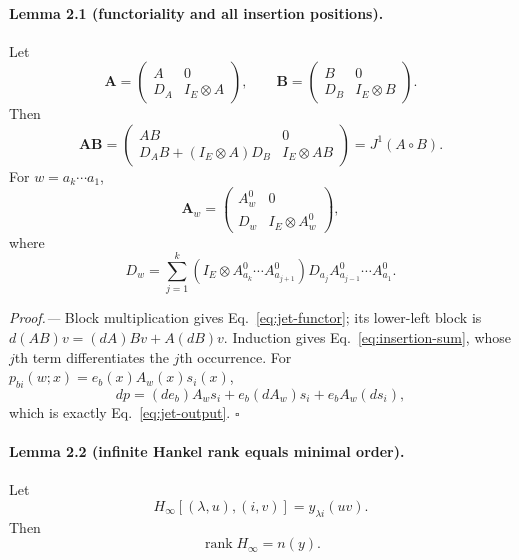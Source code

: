 \documentclass[aps,prl,onecolumn,superscriptaddress,nofootinbib]{revtex4-2}
\newcommand{\rank}{\operatorname{rank}}
\begin{document}
\paragraph{Lemma 2.1 (functoriality and all insertion positions).}
Let
\begin{equation}
 \bm A=\begin{pmatrix}A&0\\D_A&I_E\otimes A\end{pmatrix},
 \qquad
 \bm B=\begin{pmatrix}B&0\\D_B&I_E\otimes B\end{pmatrix}.
\end{equation}
Then
\begin{equation}
 \bm A\bm B=
 \begin{pmatrix}
 AB&0\\D_AB+(I_E\otimes A)D_B&I_E\otimes AB
 \end{pmatrix}=J^1(A\circ B).
 \label{eq:jet-functor}
\end{equation}
For $w=a_k\cdots a_1$,
\begin{equation}
 \bm A_w=
 \begin{pmatrix}A_w^0&0\\D_w&I_E\otimes A_w^0\end{pmatrix},
 \label{eq:word-jet}
\end{equation}
where
\begin{equation}
 D_w=\sum_{j=1}^k
 \left(I_E\otimes A_{a_k}^0\cdots A_{a_{j+1}}^0\right)
 D_{a_j}A_{a_{j-1}}^0\cdots A_{a_1}^0.
 \label{eq:insertion-sum}
\end{equation}

\emph{Proof.---}
Block multiplication gives Eq.~\eqref{eq:jet-functor}; its lower-left block is $d(AB)v=(dA)Bv+A(dB)v$.  Induction gives Eq.~\eqref{eq:insertion-sum}, whose $j$th term differentiates the $j$th occurrence.  For
$p_{bi}(w;x)=e_b(x)A_w(x)s_i(x)$,
\begin{equation}
 dp=(de_b)A_ws_i+e_b(dA_w)s_i+e_bA_w(ds_i),
 \label{eq:full-chain}
\end{equation}
which is exactly Eq.~\eqref{eq:jet-output}. \hfill$\square$

\paragraph{Lemma 2.2 (infinite Hankel rank equals minimal order).}
Let
\begin{equation}
 H_\infty[(\lambda,u),(i,v)]=y_{\lambda i}(uv).
 \label{eq:infinite-H}
\end{equation}
Then
\begin{equation}
 \rank H_\infty=n(y).
 \label{eq:hankel-rank-theorem}
\end{equation}
\end{document}
